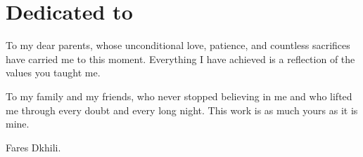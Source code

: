 \chapter*{Dedicated to}

  \begin{dedication}
  
    To my dear parents, whose unconditional love, patience, and countless
    sacrifices have carried me to this moment. Everything I have achieved is
    a reflection of the values you taught me.
    
    \par   %
    \vspace{1\baselineskip}
    
    To my family and my friends, who never stopped believing in me and who
    lifted me through every doubt and every long night. This work is as much
    yours as it is mine.

    \vspace{\baselineskip}
     Fares Dkhili.
  \end{dedication}


